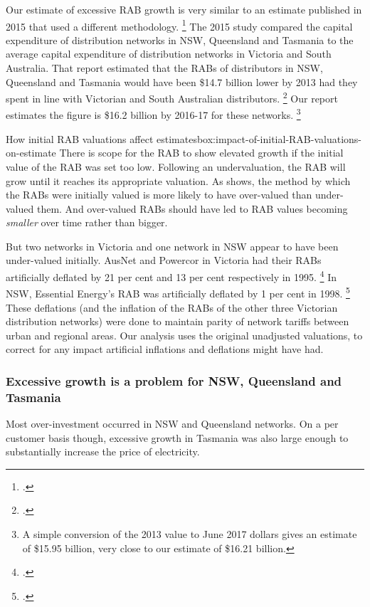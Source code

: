 \documentclass[FrontPage]{grattan}
\begin{document}
Our estimate of excessive RAB growth is very similar to an estimate published in 2015 that used a different methodology.%
\footcite{CME2015StrandedAssets}
The 2015 study compared the capital expenditure of distribution networks in NSW, Queensland and Tasmania to the average capital expenditure of distribution networks in Victoria and South Australia. That report estimated that the RABs of distributors in NSW, Queensland and Tasmania would have been \$14.7 billion lower by 2013 had they spent in line with Victorian and South Australian distributors.%
\footcite{CME2015StrandedAssets}
Our report estimates the figure is \$16.2 billion by 2016-17 for these networks.%
\footnote{A simple conversion of the 2013 value to June 2017 dollars gives an estimate of \$15.95 billion, very close to our estimate of \$16.21 billion.}

\begin{verysmallbox}{How initial RAB valuations affect estimates}{box:impact-of-initial-RAB-valuations-on-estimate}
There is scope for the RAB to show elevated growth if the initial value of the RAB was set too low. Following an undervaluation, the RAB will grow until it reaches its appropriate valuation. As  shows, the method by which the RABs were initially valued is more likely to have over-valued than under-valued them. And over-valued RABs should have led to RAB values becoming \emph{smaller} over time rather than bigger.

But two networks in Victoria and one network in NSW appear to have been under-valued initially. AusNet and Powercor in Victoria had their RABs artificially deflated by 21 per cent and 13 per cent respectively in 1995.%
\footcite[][79]{VicGovt1995GazetteElectricity}
In NSW, Essential Energy's RAB was artificially deflated by 1 per cent in 1998.%
\footcite[][68--69]{IPART1999PricingVolOne} 
These deflations (and the inflation of the RABs of the other three Victorian distribution networks) were done to maintain parity of network tariffs between urban and regional areas. Our analysis uses the original unadjusted valuations, to correct for any impact artificial inflations and deflations might have had.
\end{verysmallbox}

\subsubsection{Excessive growth is a problem for NSW, Queensland and Tasmania}\label{subsubsec:focus-on-nsw-qld-tas}
Most over-investment occurred in NSW and Queensland networks. On a per customer basis though, excessive growth in Tasmania was also large enough to substantially increase the price of electricity. 
\end{document}
